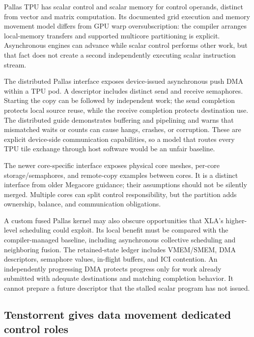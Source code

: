 Pallas TPU has scalar control and scalar memory for control operands, distinct from vector and matrix computation. Its documented grid execution and memory movement model differs from GPU warp oversubscription: the compiler arranges local-memory transfers and supported multicore partitioning is explicit. Asynchronous engines can advance while scalar control performs other work, but that fact does not create a second independently executing scalar instruction stream.~\citep{u005-pallas-details}

The distributed Pallas interface exposes device-issued asynchronous push DMA within a TPU pod. A descriptor includes distinct send and receive semaphores. Starting the copy can be followed by independent work; the send completion protects local source reuse, while the receive completion protects destination use. The distributed guide demonstrates buffering and pipelining and warns that mismatched waits or counts can cause hangs, crashes, or corruption. These are explicit device-side communication capabilities, so a model that routes every TPU tile exchange through host software would be an unfair baseline.~\citep{u006-pallas-distributed}

The newer core-specific interface exposes physical core meshes, per-core storage/semaphores, and remote-copy examples between cores. It is a distinct interface from older Megacore guidance; their assumptions should not be silently merged. Multiple cores can split control responsibility, but the partition adds ownership, balance, and communication obligations.~\citep{u006-pallas-coremap}

A custom fused Pallas kernel may also obscure opportunities that XLA's higher-level scheduling could exploit. Its local benefit must be compared with the compiler-managed baseline, including asynchronous collective scheduling and neighboring fusion. The retained-state ledger includes VMEM/SMEM, DMA descriptors, semaphore values, in-flight buffers, and ICI contention. An independently progressing DMA protects progress only for work already submitted with adequate destinations and matching completion behavior. It cannot prepare a future descriptor that the stalled scalar program has not issued.

\subsection{Tenstorrent gives data movement dedicated control roles}

